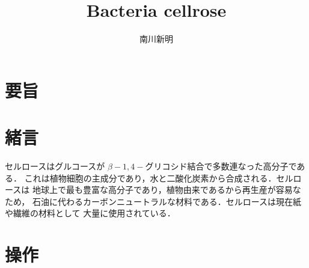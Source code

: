 \documentclass[uplatex, dvipdfmx, 10pt]{jarticle}
\title{{\huge Bacteria cellrose}}
\author{南川新明}
\begin{document}
        
            \begin{titlepage}
                \begin{center}

                    \vspace{10truept}


                    \vspace*{180truept}


                    \vspace{100truept}
                    

                    \vspace{10truept}


                    \vspace{70truept}
                    

                    \vspace{10truept}

                \end{center}
            \end{titlepage}
        
        \section*{要旨}

        \section*{緒言}
            
            セルロースはグルコースが $\beta-1,4-$グリコシド結合で多数連なった高分子である．
            これは植物細胞の主成分であり，水と二酸化炭素から合成される．セルロースは
            地球上で最も豊富な高分子であり，植物由来であるから再生産が容易なため，
            石油に代わるカーボンニュートラルな材料である．セルロースは現在紙や繊維の材料として
            大量に使用されている．

        \section*{操作}
            
\end{document}
